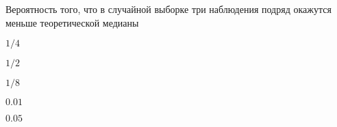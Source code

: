 
\begin{question}
Вероятность того, что в случайной выборке три наблюдения подряд окажутся
меньше теоретической медианы
\begin{answerlist}
  \item \(1/4\)
  \item \(1/2\)
  \item \(1/8\)
  \item \(0.01\)
  \item \(0.05\)
\end{answerlist}
\end{question}


